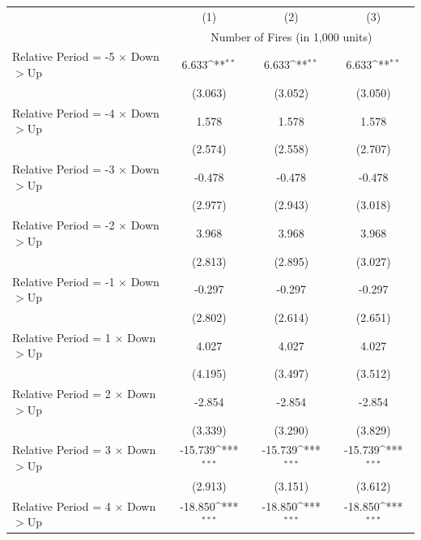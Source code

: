 {
\def\sym#1{\ifmmode^{#1}\else\(^{#1}\)\fi}
\begin{tabular}{l*{3}{c}}
\hline
            & \multicolumn{1}{c}{(1)} & \multicolumn{1}{c}{(2)} & \multicolumn{1}{c}{(3)} \\
            & \multicolumn{3}{c}{Number of Fires (in 1,000 units)} \\ \hline

Relative Period = -5 $\times$ Down$>$Up&       6.633\sym{**} &       6.633\sym{**} &       6.633\sym{**} \\
            &     (3.063)         &     (3.052)         &     (3.050)         \\
Relative Period = -4 $\times$ Down$>$Up&       1.578         &       1.578         &       1.578         \\
            &     (2.574)         &     (2.558)         &     (2.707)         \\
Relative Period = -3 $\times$ Down$>$Up&      -0.478         &      -0.478         &      -0.478         \\
            &     (2.977)         &     (2.943)         &     (3.018)         \\
Relative Period = -2 $\times$ Down$>$Up&       3.968         &       3.968         &       3.968         \\
            &     (2.813)         &     (2.895)         &     (3.027)         \\
Relative Period = -1 $\times$ Down$>$Up&      -0.297         &      -0.297         &      -0.297         \\
            &     (2.802)         &     (2.614)         &     (2.651)         \\
Relative Period = 1 $\times$ Down$>$Up&       4.027         &       4.027         &       4.027         \\
            &     (4.195)         &     (3.497)         &     (3.512)         \\
Relative Period = 2 $\times$ Down$>$Up&      -2.854         &      -2.854         &      -2.854         \\
            &     (3.339)         &     (3.290)         &     (3.829)         \\
Relative Period = 3 $\times$ Down$>$Up&     -15.739\sym{***}&     -15.739\sym{***}&     -15.739\sym{***}\\
            &     (2.913)         &     (3.151)         &     (3.612)         \\
Relative Period = 4 $\times$ Down$>$Up&     -18.850\sym{***}&     -18.850\sym{***}&     -18.850\sym{***}\\

\end{tabular}}
